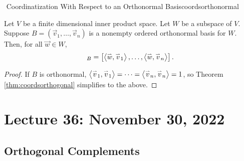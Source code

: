         \begin{theorem}{\Stop\,\,Coordinatization With Respect to an Orthonormal Basis}{coordsorthonormal}

            Let \(V\) be a finite dimensional inner product space. Let \(W\) be a subspace of \(V\). Suppose \(B=(\vec{v}_1,\ldots,\vec{v}_n)\) is a nonempty ordered orthonormal basis for \(W\). Then, for all \(\vec{w}\in W\),
            \begin{equation*}
                [\vec{w}]_B=\left[\iprod{\vec{w}}{\vec{v}_1},\ldots,\iprod{\vec{w}}{\vec{v}_n}\right].
            \end{equation*}
            \begin{proof}
                If \(B\) is orthonormal, \(\left\langle \overset{_{\rightharpoonup}}{v}_1,\overset{_{\rightharpoonup}}{v}_1\right\rangle=\cdots=\left\langle \overset{_{\rightharpoonup}}{v}_n,\overset{_{\rightharpoonup}}{v}_n\right\rangle=1\), so Theorem \ref{thm:coordsorthogonal} simplifies to the above.
            \end{proof}

        \end{theorem}
        \pagebreak

\section{Lecture 36: November 30, 2022}

    \subsection{Orthogonal Complements}

